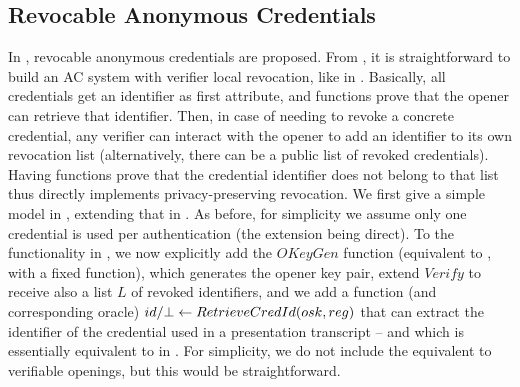   





\subsection{Revocable Anonymous Credentials}
\label{sapp:related-models-rac}

In \cite{cks10}, revocable anonymous credentials are proposed. From \CUASGen, it
is straightforward to build an AC system with verifier local revocation, like in
\cite{bs04}. Basically, all credentials get an identifier as first attribute,
and \feval functions prove that the opener can retrieve that identifier. Then,
in case of needing to revoke a concrete credential, any verifier can interact
with the opener to add an identifier to its own revocation list (alternatively,
there can be a public list of revoked credentials). Having \feval functions
prove that the credential identifier does not belong to that list thus directly
implements privacy-preserving revocation. We first give a simple model in
, extending that in . As
before, for simplicity we assume only one credential is used per authentication
(the extension being direct). To the functionality in
, we now explicitly add the $OKeyGen$ function
(equivalent to \OKeyGen, with a fixed \finsp function),
which generates the opener key pair, extend $Verify$ to receive also a list $L$
of revoked identifiers, and we add a function (and corresponding oracle) $id/\bot
\gets RetrieveCredId(osk,reg)$ that can extract the identifier of the
credential used in a presentation transcript \utrans -- and which is essentially
equivalent to \Open in \UAS. For simplicity, we do not include the equivalent to
verifiable openings, but this would be straightforward.

